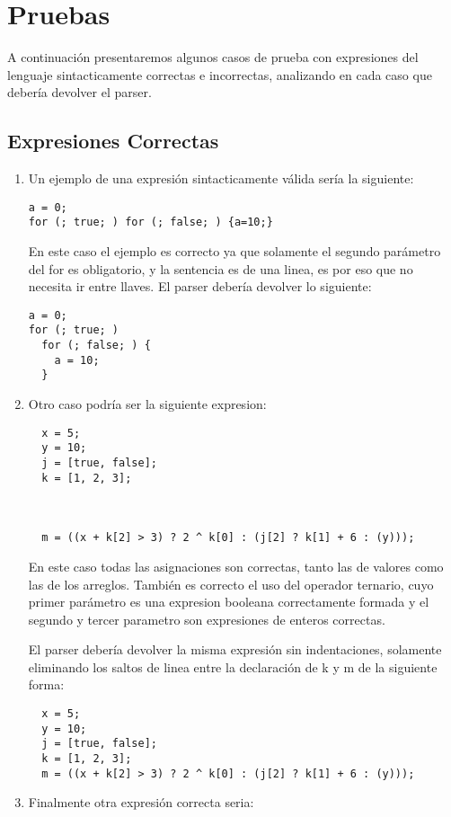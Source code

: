 \section{Pruebas}
A continuación presentaremos algunos casos de prueba con expresiones del
lenguaje sintacticamente correctas e incorrectas, analizando en cada caso que
debería devolver el parser.

\subsection{Expresiones Correctas}
\begin{enumerate}
\item
Un ejemplo de una expresión sintacticamente válida sería la siguiente:
\begin{verbatim}
a = 0;
for (; true; ) for (; false; ) {a=10;}
\end{verbatim}
En este caso el ejemplo es correcto ya que solamente el segundo parámetro del
for es obligatorio, y la sentencia es de una linea, es por eso que no
necesita ir entre llaves. El parser debería devolver lo siguiente:
\begin{verbatim}
a = 0;
for (; true; )
  for (; false; ) {
    a = 10;
  }
\end{verbatim}

\item Otro caso podría ser la siguiente expresion:
  \begin{verbatim}
  x = 5;
  y = 10;
  j = [true, false];
  k = [1, 2, 3];
 


  m = ((x + k[2] > 3) ? 2 ^ k[0] : (j[2] ? k[1] + 6 : (y)));
  \end{verbatim}
  En este caso todas las asignaciones son correctas, tanto las de valores como
  las de los arreglos. También es correcto el uso del operador ternario, cuyo
  primer parámetro es una expresion booleana correctamente formada y el segundo
  y tercer parametro son expresiones de enteros correctas.

  El parser debería devolver la misma expresión sin indentaciones, solamente
  eliminando los saltos de linea entre la declaración de k y m de la siguiente
  forma:
\begin{verbatim}
  x = 5;
  y = 10;
  j = [true, false];
  k = [1, 2, 3];
  m = ((x + k[2] > 3) ? 2 ^ k[0] : (j[2] ? k[1] + 6 : (y)));
  \end{verbatim}


\item Finalmente otra expresión correcta seria:


\end{enumerate}
